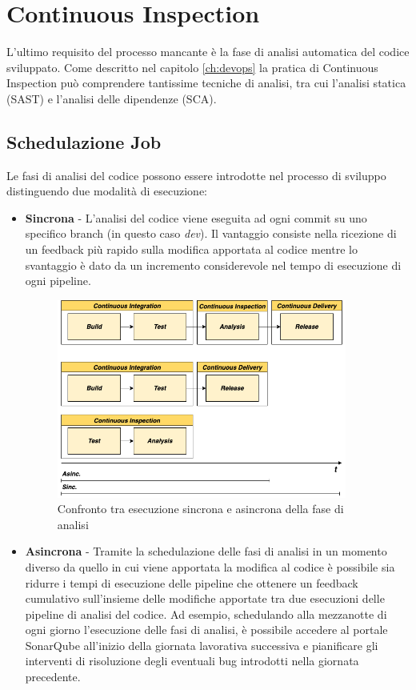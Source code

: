 \section{Continuous Inspection}
L'ultimo requisito del processo mancante è la fase di analisi automatica del codice sviluppato. Come descritto nel capitolo \ref{ch:devops} la pratica di Continuous Inspection può comprendere tantissime tecniche di analisi, tra cui l'analisi statica (SAST) e l'analisi delle dipendenze (SCA).

\subsection{Schedulazione Job}
Le fasi di analisi del codice possono essere introdotte nel processo di sviluppo distinguendo due modalità di esecuzione:

\begin{itemize}
    \item \textbf{Sincrona} - L'analisi del codice viene eseguita ad ogni commit su uno specifico branch (in questo caso \textit{dev}). Il vantaggio consiste nella ricezione di un feedback più rapido sulla modifica apportata al codice mentre lo svantaggio è dato da un incremento considerevole nel tempo di esecuzione di ogni pipeline.
    
    \begin{figure}[H]
        \centering
        \includegraphics[width=0.9\textwidth]{img/inspection-sync-async.png}
        \caption{Confronto tra esecuzione sincrona e asincrona della fase di analisi}
        \label{inspection-sync-async}
    \end{figure}
    
    \item \textbf{Asincrona} - Tramite la schedulazione delle fasi di analisi in un momento diverso da quello in cui viene apportata la modifica al codice è possibile sia ridurre i tempi di esecuzione delle pipeline che ottenere un feedback cumulativo sull'insieme delle modifiche apportate tra due esecuzioni delle pipeline di analisi del codice. Ad esempio, schedulando alla mezzanotte di ogni giorno l'esecuzione delle fasi di analisi, è possibile accedere al portale SonarQube all'inizio della giornata lavorativa successiva e pianificare gli interventi di risoluzione degli eventuali bug introdotti nella giornata precedente.
\end{itemize}

